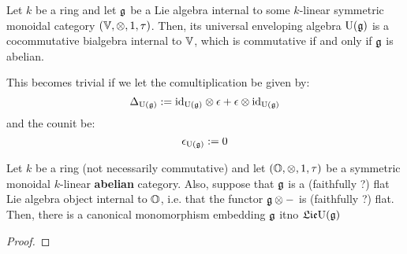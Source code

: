                 \begin{remark} \label{remark: universal_enveloping_algebras_are_bialgebras}
                    Let $k$ be a ring and let $\mathfrak{g}$ be a Lie algebra internal to some $k$-linear symmetric monoidal category $(\V, \tensor, 1, \tau)$. Then, its universal enveloping algebra $\mathrm{U}(\mathfrak{g})$ is a cocommutative bialgebra internal to $\mathbb{V}$, which is commutative if and only if $\mathfrak{g}$ is abelian. 
                    
                    This becomes trivial if we let the comultiplication be given by:
                        $$\Delta_{\U(\g)} := \id_{\U(\g)} \tensor \e + \e \tensor \id_{\U(\g)}$$
                    and the counit be:
                        $$\epsilon_{\mathrm{U}(\mathfrak{g})} := 0$$
                \end{remark}
                    
                \begin{lemma}
                    Let $k$ be a ring (not necessarily commutative) and let $(\O, \tensor, 1, \tau)$ be a symmetric monoidal $k$-linear \textbf{abelian} category. Also, suppose that $\mathfrak{g}$ is a (faithfully ?) flat Lie algebra object internal to $\mathbb{O}$, i.e. that the functor $\g \tensor -$ is (faithfully ?) flat. Then, there is a canonical monomorphism embedding $\mathfrak{g}$ itno $\mathfrak{Lie} \mathrm{U}(\mathfrak{g})$
                \end{lemma}
                    \begin{proof}
                    \end{proof}
                

